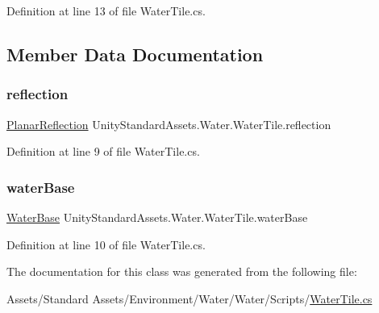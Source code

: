 Definition at line 13 of file Water\+Tile.\+cs.



\subsection{Member Data Documentation}
\mbox{\label{class_unity_standard_assets_1_1_water_1_1_water_tile_afbbdc233e3c3eb9bdb994cd649761f5d}} 
\subsubsection{\texorpdfstring{reflection}{reflection}}
{\footnotesize\ttfamily \mbox{\hyperlink{class_unity_standard_assets_1_1_water_1_1_planar_reflection}{Planar\+Reflection}} Unity\+Standard\+Assets.\+Water.\+Water\+Tile.\+reflection}



Definition at line 9 of file Water\+Tile.\+cs.

\mbox{\label{class_unity_standard_assets_1_1_water_1_1_water_tile_a67837989d45fc4836b938f8899a35bb3}} 
\subsubsection{\texorpdfstring{water\+Base}{waterBase}}
{\footnotesize\ttfamily \mbox{\hyperlink{class_unity_standard_assets_1_1_water_1_1_water_base}{Water\+Base}} Unity\+Standard\+Assets.\+Water.\+Water\+Tile.\+water\+Base}



Definition at line 10 of file Water\+Tile.\+cs.



The documentation for this class was generated from the following file\+:\begin{DoxyCompactItemize}
\item 
Assets/\+Standard Assets/\+Environment/\+Water/\+Water/\+Scripts/\mbox{\hyperlink{_water_tile_8cs}{Water\+Tile.\+cs}}\end{DoxyCompactItemize}
